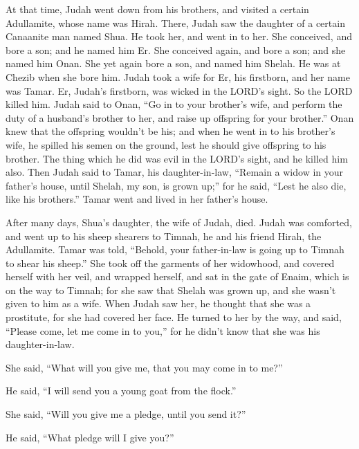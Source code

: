 \mychapter{}
\myverse*{}At that time, Judah went down from his brothers, and visited a certain Adullamite, whose name was Hirah.   \myverse{}There, Judah saw the daughter of a certain Canaanite man named Shua. He took her, and went in to her.   \myverse{}She conceived, and bore a son; and he named him Er.   \myverse{}She conceived again, and bore a son; and she named him Onan.   \myverse{}She yet again bore a son, and named him Shelah. He was at Chezib when she bore him.   \myverse{}Judah took a wife for Er, his firstborn, and her name was Tamar.   \myverse{}Er, Judah’s firstborn, was wicked in the LORD’s sight. So the LORD killed him.   \myverse{}Judah said to Onan, “Go in to your brother’s wife, and perform the duty of a husband’s brother to her, and raise up offspring for your brother.”   \myverse{}Onan knew that the offspring wouldn’t be his; and when he went in to his brother’s wife, he spilled his semen on the ground, lest he should give offspring to his brother.   \myverse{}The thing which he did was evil in the LORD’s sight, and he killed him also.   \myverse{}Then Judah said to Tamar, his daughter-in-law, “Remain a widow in your father’s house, until Shelah, my son, is grown up;” for he said, “Lest he also die, like his brothers.” Tamar went and lived in her father’s house.

\myverse{}After many days, Shua’s daughter, the wife of Judah, died. Judah was comforted, and went up to his sheep shearers to Timnah, he and his friend Hirah, the Adullamite.   \myverse{}Tamar was told, “Behold, your father-in-law is going up to Timnah to shear his sheep.”   \myverse{}She took off the garments of her widowhood, and covered herself with her veil, and wrapped herself, and sat in the gate of Enaim, which is on the way to Timnah; for she saw that Shelah was grown up, and she wasn’t given to him as a wife.   \myverse{}When Judah saw her, he thought that she was a prostitute, for she had covered her face.   \myverse{}He turned to her by the way, and said, “Please come, let me come in to you,” for he didn’t know that she was his daughter-in-law.

She said, “What will you give me, that you may come in to me?”

\myverse{}He said, “I will send you a young goat from the flock.”

She said, “Will you give me a pledge, until you send it?”

\myverse{}He said, “What pledge will I give you?”

